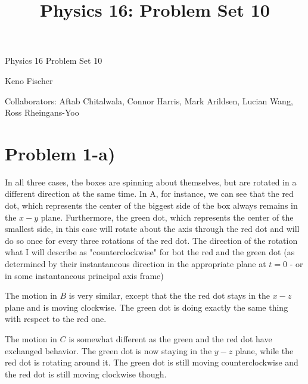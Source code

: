 \title{Physics 16: Problem Set 10}

\begin{center}
Physics 16 Problem Set 10 \par
Keno Fischer \par
Collaborators: Aftab Chitalwala, Connor Harris, Mark Arildsen, Lucian Wang, Ross Rheingans-Yoo
\end{center}
\section*{Problem 1-a)}
In all three cases, the boxes are spinning about themselves, but are rotated in a different direction at the same time. In A, for instance, we can see that the red dot, which represents the center of the biggest side of the box always remains in the $x-y$ plane. Furthermore, the green dot, which represents the center of the smallest side, in this case will rotate about the axis through the red dot and will do so once for every three rotations of the red dot. The direction of the rotation what I will describe as "counterclockwise" for bot the red and the green dot (as determined by their instantaneous direction in the appropriate plane at $t=0$ - or in some instantaneous principal axis frame)  \par
The motion in $B$ is very similar, except that the the red dot stays in the $x-z$ plane and is moving clockwise. The green dot is doing exactly the same thing with respect to the red one.
\par
The motion in $C$ is somewhat different as the green and the red dot have exchanged behavior. The green dot is now staying in the $y-z$ plane, while the red dot is rotating around it. The green dot is still moving counterclockwise and the red dot is still moving clockwise though. 
